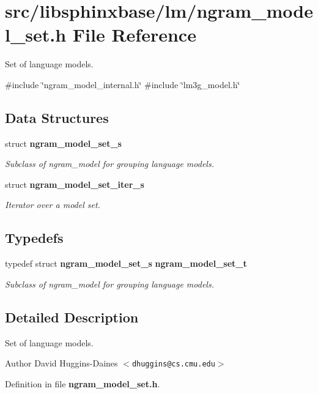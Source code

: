 \section{src/libsphinxbase/lm/ngram\-\_\-model\-\_\-set.h \-File \-Reference}
\label{ngram__model__set_8h}


\-Set of language models.  


{\ttfamily \#include \char`\"{}ngram\-\_\-model\-\_\-internal.\-h\char`\"{}}\*
{\ttfamily \#include \char`\"{}lm3g\-\_\-model.\-h\char`\"{}}\*
\subsection*{\-Data \-Structures}
\begin{DoxyCompactItemize}
\item 
struct {\bf ngram\-\_\-model\-\_\-set\-\_\-s}
\begin{DoxyCompactList}\small\item\em \-Subclass of ngram\-\_\-model for grouping language models. \end{DoxyCompactList}\item 
struct {\bf ngram\-\_\-model\-\_\-set\-\_\-iter\-\_\-s}
\begin{DoxyCompactList}\small\item\em \-Iterator over a model set. \end{DoxyCompactList}\end{DoxyCompactItemize}
\subsection*{\-Typedefs}
\begin{DoxyCompactItemize}
\item 
typedef struct {\bf ngram\-\_\-model\-\_\-set\-\_\-s} {\bf ngram\-\_\-model\-\_\-set\-\_\-t}\label{ngram__model__set_8h_af89b4060ed18e3f4e3ac0490a09d5745}

\begin{DoxyCompactList}\small\item\em \-Subclass of ngram\-\_\-model for grouping language models. \end{DoxyCompactList}\end{DoxyCompactItemize}


\subsection{\-Detailed \-Description}
\-Set of language models. \begin{DoxyAuthor}{\-Author}
\-David \-Huggins-\/\-Daines $<${\tt dhuggins@cs.\-cmu.\-edu}$>$ 
\end{DoxyAuthor}


\-Definition in file {\bf ngram\-\_\-model\-\_\-set.\-h}.

